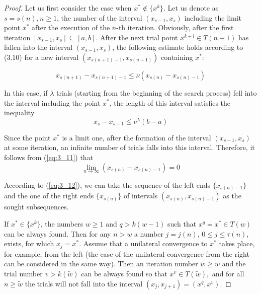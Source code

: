 	\begin{proof} Let us first consider the case when $x^{*} \notin \{ x^{k} \} $. Let us denote as $s=s(n),n\ge 1$, the number of the interval $(x_{s-1} ,x_{s} )$ including the limit point $x^{*} $ after the execution of the $n$-th iteration. Obviously, after the first iteration $[x_{s-1} ,x_{s} ]\subseteq [a,b]$. After the next trial point $x^{k+l} \in T(n+1)$ has fallen into the interval $(x_{s-1} ,x_{s} )$, the following estimate holds according to (3.10) for a new interval $(x_{s(n+1)-1} ,x_{s(n+1)} )$ containing $x^{*} $: 
	
	\begin{equation*}
		x_{s(n+1)} -x_{s(n+1)-1} \le \nu (x_{s(n)} -x_{s(n)-1} )
	\end{equation*}
	
	In this case, if $\lambda$ trials (starting from the beginning of the search process) fell into the interval including the point $x^{*} $, the length of this interval satisfies the inequality 
	\begin{equation}
	\label{eq:3_11}
	x_{s} -x_{s-1} \le \nu ^{\lambda } (b-a)
	\end{equation}
	
	Since the point $x^{*}$ is a limit one, after the formation of the interval $(x_{s-1} ,x_{s} )$ at some iteration, an infinite number of trials falls into this interval. Therefore, it follows from (\ref{eq:3_11}) that 
	\begin{equation}
	\label{eq:3_12}
	\mathop{\lim }\limits_{n\to \infty } (x_{s(n)} -x_{s(n)-1} )=0 
	\end{equation}
	
	According to  (\ref{eq:3_12}), we can take the sequence of the left ends $\{ x_{s(n)-1} \} $ and the one of the right ends $\{ x_{s(n)} \} $ of intervals $(x_{s(n)} ,x_{s(n)-1} )$ as the sought subsequences. 
	
	If $x^{*} \in \{ x^{k} \} $, the numbers $w\ge 1$ and $q>k(w-1)$ such that $x^{q} =x^{*} \in T(w)$ can be always found. Then for any $n>w$ a number $j=j(n)$, $0\le j\le \tau (n)$, exists, for which $x_{j} =x^{*} $. Assume that a unilateral convergence to $x^{*} $ takes place, for example, from the left (the case of the unilateral convergence from the right can be considered in the same way). Then an iteration number $\tilde{w}\ge w$ and the trial number $v>k(\tilde{w})$ can be always found so that $x^{v} \in T(\tilde{w}),$ and for all $n\ge \tilde{w}$ the trials will not fall into the interval $(x_{j} ,x_{j+1} )=(x^{q} ,x^{v} )$. 
	

\end{proof}
